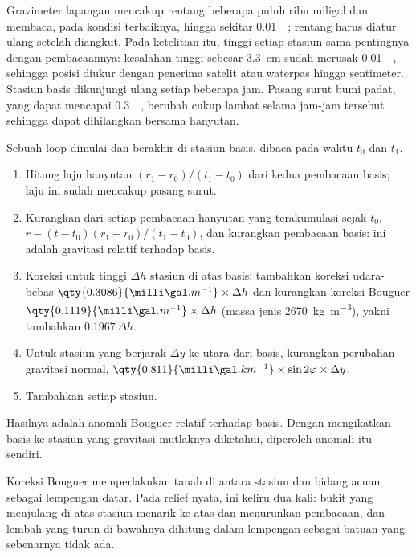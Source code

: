 Gravimeter lapangan mencakup rentang beberapa puluh ribu
miligal dan membaca, pada kondisi terbaiknya, hingga sekitar \qty{0.01}{\milli\gal}; rentang
harus diatur ulang setelah diangkut. Pada ketelitian itu, tinggi
setiap stasiun sama pentingnya dengan pembacaannya: kesalahan tinggi
sebesar \qty{3.3}{cm} sudah merusak \qty{0.01}{\milli\gal}, sehingga posisi diukur
dengan penerima satelit atau waterpas hingga sentimeter. Stasiun basis
dikunjungi ulang setiap beberapa jam. Pasang surut bumi padat, yang dapat
mencapai \qty{0.3}{\milli\gal}, berubah cukup lambat selama jam-jam tersebut
sehingga dapat dihilangkan bersama hanyutan.

\begin{method}\label{met:b3:field-lab-methods-3:loop}
Sebuah loop dimulai dan berakhir di stasiun basis, dibaca pada waktu $t_0$ dan $t_1$.
\begin{enumerate}
  \item Hitung laju hanyutan $(r_1 - r_0)/(t_1 - t_0)$ dari kedua
        pembacaan basis; laju ini sudah mencakup pasang surut.
  \item Kurangkan dari setiap pembacaan hanyutan yang terakumulasi sejak $t_0$,
        $r - (t - t_0)(r_1 - r_0)/(t_1 - t_0)$, dan kurangkan
        pembacaan basis: ini adalah gravitasi relatif terhadap basis.
  \item Koreksi untuk tinggi $\Delta h$ stasiun di atas basis:
        tambahkan koreksi udara-bebas $\qty{0.3086}{\milli\gal.m^{-1}}
        \times\Delta h$ dan kurangkan koreksi Bouguer
        $\qty{0.1119}{\milli\gal.m^{-1}}\times\Delta h$ (massa jenis
        \qty{2670}{kg.m^{-3}}), yakni tambahkan $0.1967\,\Delta h$.
  \item Untuk stasiun yang berjarak $\Delta y$ ke utara dari basis, kurangkan
        perubahan gravitasi normal, $\qty{0.811}{\milli\gal.km^{-1}}
        \times\sin 2\varphi\times\Delta y$.
  \item Tambahkan  setiap stasiun.
\end{enumerate}
Hasilnya adalah anomali Bouguer relatif terhadap basis. Dengan mengikatkan basis
ke stasiun yang gravitasi mutlaknya diketahui, diperoleh anomali itu sendiri.
\end{method}

Koreksi Bouguer memperlakukan tanah di antara stasiun dan
bidang acuan sebagai lempengan datar. Pada relief nyata, ini keliru dua kali:
bukit yang menjulang di atas stasiun menarik ke atas dan menurunkan
pembacaan, dan lembah yang turun di bawahnya dihitung dalam lempengan sebagai
batuan yang sebenarnya tidak ada.

